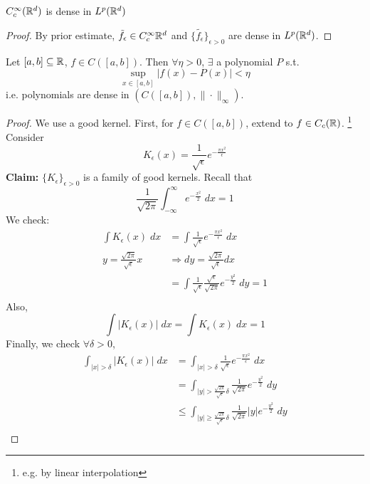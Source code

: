 \begin{cor}
    $C_c^\infty(\mathbb{R}^d)$ is dense in $L^p(\mathbb{R}^d)$
\end{cor}
\begin{proof}
    By prior estimate, $\tilde{f_\epsilon} \in C_c^\infty{\mathbb{R}^d}$ and $\{\tilde{f_\epsilon}\}_{\epsilon > 0}$
    are dense in $L^p(\mathbb{R}^d)$. \qedhere   
\end{proof}

\begin{thm}
    Let $[a, b] \subseteq \mathbb{R}$, $f \in C([a,b])$. Then $\forall \eta > 0$, $\exists$ a polynomial
    $P$ s.t. 
    \[
        \sup_{x \in [a,b]} |f(x) - P(x)| < \eta
    \]      
    i.e. polynomials are dense in $(C([a,b]), \|\cdot\|_\infty)$.
\end{thm}
\begin{proof}
    We use a good kernel. First, for $f \in C([a,b])$, extend to $f \in C_c(\mathbb{R})$.  \footnote{e.g. by linear interpolation}  
    Consider 
    \[
        K_\epsilon(x) = \frac{1}{\sqrt{\epsilon}}e^{-\frac{\pi x^2}{\epsilon}}
    \] 
    \textbf{Claim:} $\{K_\epsilon\}_{\epsilon > 0}$ is a family of good kernels.
    \newline \noindent Recall that
    \[
        \frac{1}{\sqrt{2\pi}} \int_{-\infty}^\infty e^{-\frac{x^2}{2}} \; dx = 1
    \] 
    We check:
    \begin{align*}
        \int K_\epsilon(x) \; dx &= \int \frac{1}{\sqrt{\epsilon}}e^{-\frac{\pi x^2}{\epsilon}} \; dx \\
        y = \frac{\sqrt{2\pi}}{\sqrt{\epsilon}}x &\Rightarrow dy = \frac{\sqrt{2\pi}}{\sqrt{\epsilon}}dx \\
        &= \int \frac{1}{\sqrt{\epsilon}} \frac{\sqrt{\epsilon}}{\sqrt{2\pi}} e^{-\frac{y^2}{2}} \; dy  = 1\\
    \end{align*}
    Also, 
    \[
        \int |K_\epsilon(x)| \; dx = \int K_\epsilon(x) \; dx = 1
    \] 
    Finally, we check $\forall \delta > 0$,
    \begin{align*}
        \int_{|x| > \delta} |K_\epsilon(x)| \; dx &= \int_{|x| > \delta} \frac{1}{\sqrt{\epsilon}} e^{-\frac{\pi x^2}{\epsilon}} \; dx \\
        &= \int_{|y| > \frac{\sqrt{2\pi}}{\sqrt{\epsilon}} \delta} \frac{1}{\sqrt{2\pi}} e^{-\frac{y^2}{2}} \; dy \\
        &\leq \int_{|y| \geq \frac{\sqrt{2\pi}}{\sqrt{\epsilon}} \delta} \frac{1}{\sqrt{2\pi}} |y| e^{-\frac{y^2}{2}} \; dy \\

\end{align*}
\end{proof}
